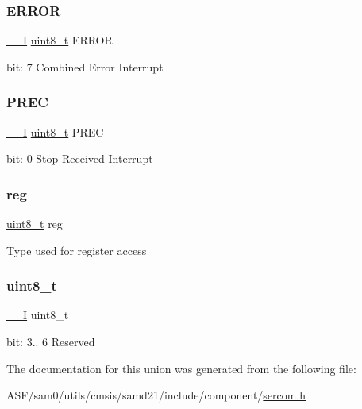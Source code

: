 \subsubsection{\texorpdfstring{ERROR}{ERROR}}
{\footnotesize\ttfamily \mbox{\hyperlink{core__cm0plus_8h_af63697ed9952cc71e1225efe205f6cd3}{\+\_\+\+\_\+I}} \mbox{\hyperlink{union_s_e_r_c_o_m___i2_c_s___i_n_t_f_l_a_g___type_a5b4208c6f4c4a4290c4f2804d1eb1d5b}{uint8\+\_\+t}} E\+R\+R\+OR}

bit\+: 7 Combined Error Interrupt \mbox{\label{union_s_e_r_c_o_m___i2_c_s___i_n_t_f_l_a_g___type_a621168cf741d57ad708e138a725eb1ae}} 
\subsubsection{\texorpdfstring{PREC}{PREC}}
{\footnotesize\ttfamily \mbox{\hyperlink{core__cm0plus_8h_af63697ed9952cc71e1225efe205f6cd3}{\+\_\+\+\_\+I}} \mbox{\hyperlink{union_s_e_r_c_o_m___i2_c_s___i_n_t_f_l_a_g___type_a5b4208c6f4c4a4290c4f2804d1eb1d5b}{uint8\+\_\+t}} P\+R\+EC}

bit\+: 0 Stop Received Interrupt \mbox{\label{union_s_e_r_c_o_m___i2_c_s___i_n_t_f_l_a_g___type_a9428adc9af4653a2050e2536b55dec8d}} 
\subsubsection{\texorpdfstring{reg}{reg}}
{\footnotesize\ttfamily \mbox{\hyperlink{union_s_e_r_c_o_m___i2_c_s___i_n_t_f_l_a_g___type_a5b4208c6f4c4a4290c4f2804d1eb1d5b}{uint8\+\_\+t}} reg}

Type used for register access \mbox{\label{union_s_e_r_c_o_m___i2_c_s___i_n_t_f_l_a_g___type_a5b4208c6f4c4a4290c4f2804d1eb1d5b}} 
\subsubsection{\texorpdfstring{uint8\_t}{uint8\_t}}
{\footnotesize\ttfamily \mbox{\hyperlink{core__cm0plus_8h_af63697ed9952cc71e1225efe205f6cd3}{\+\_\+\+\_\+I}} uint8\+\_\+t}

bit\+: 3.. 6 Reserved 

The documentation for this union was generated from the following file\+:\begin{DoxyCompactItemize}
\item 
A\+S\+F/sam0/utils/cmsis/samd21/include/component/\mbox{\hyperlink{utils_2cmsis_2samd21_2include_2component_2sercom_8h}{sercom.\+h}}\end{DoxyCompactItemize}

